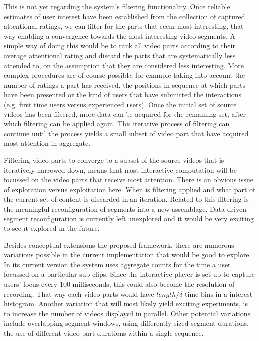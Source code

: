 This is not yet regarding the system's filtering functionality. Once reliable estimates of user interest have been established from the collection of captured attentional ratings, we can filter for the parts that seem most interesting, that way enabling a convergence towards the most interesting video segments. A simple way of doing this would be to rank all video parts according to their average attentional rating and discard the parts that are systematically less attended to, on the assumption that they are considered less interesting. More complex procedures are of course possible, for example taking into account the number of ratings a part has received, the positions in sequence at which parts have been presented or the kind of users that have submitted the interactions (e.g. first time users versus experienced users). Once the initial set of source videos has been filtered, more data can be acquired for the remaining set, after which filtering can be applied again. This iterative process of filtering can continue until the process yields a small subset of video part that have acquired most attention in aggregate.

Filtering video parts to converge to a subset of the source videos that is  iteratively narrowed down, means that most interactive computation will be focussed on the video parts that receive most attention. There is an obvious issue of exploration versus exploitation here. When is filtering applied and what part of the current set of content is discarded in an iteration. Related to this filtering is the meaningful reconfiguration of segments into a new assemblage. Data-driven segment reconfiguration is currently left unexplored and it would be very exciting to see it explored in the future.

Besides conceptual extensions the proposed framework, there are numerous variations possible in the current implementation that would be good to explore. In its current version the system uses aggregate counts for the time a user focussed on a particular sub-clips. Since the interactive player is set up to capture users' focus every 100 milliseconds, this could also become the resolution of recording. That way each video parts would have $length/\delta$ time bins in a interest histogram. Another variation that will most likely yield exciting experiments, is to increase the number of videos displayed in parallel. Other potential variations include overlapping segment windows, using differently sized segment durations, the use of different video part durations within a single sequence.

